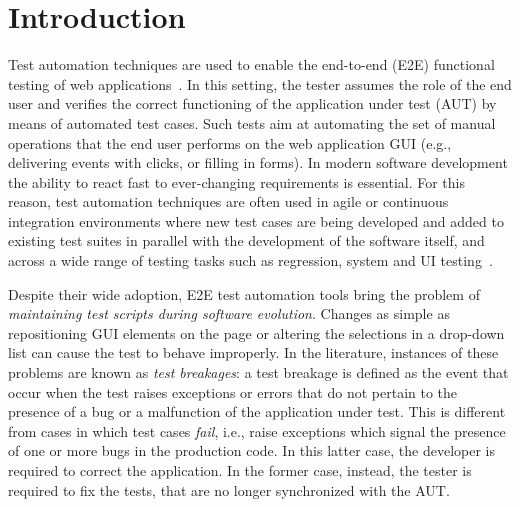 \section{Introduction}\label{sec:introduction}

Test automation techniques are used to enable the end-to-end (E2E) functional testing of web applications~\cite{DBLP:journals/ac/TonellaRM14}. 
In this setting, the tester assumes the role of the end user and verifies the correct functioning of the application under test (AUT) by means of automated test cases. Such tests aim at automating the set of manual operations that the end user  performs on the web application GUI (e.g., delivering events with clicks, or filling in forms). 
In modern software development the ability to react fast to ever-changing requirements is essential. For this reason, test automation techniques are often used in agile or continuous integration environments where new test cases are being developed and added to existing test suites in parallel with the development of the software itself, and across a wide range of testing tasks such as regression, system and UI testing~\cite{STVR:STVR121,Fewster,Ramler:2006:EPT:1138929.1138946,Nguyen2014,7381848}.


Despite their wide adoption, E2E test automation tools bring the problem of \textit{maintaining test scripts during software evolution}. Changes as simple as repositioning GUI elements on the page or altering the selections in a drop-down list can cause the test to behave improperly. 
In the literature, instances of these problems are known as \textit{test breakages}: a test breakage is defined as the event that occur when the test raises exceptions or errors that do not pertain to the presence of a bug or a malfunction of the application under test. This is different from cases in which
test cases \textit{fail}, i.e., raise exceptions which signal the presence of one or more bugs in the production code. In this latter case, the developer is required to correct the application. In the former case, instead, the tester is required to fix the tests, that are no longer synchronized with the AUT.


